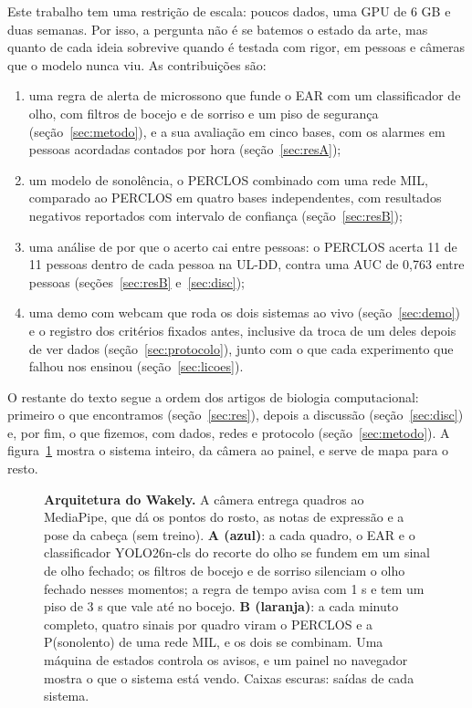 \documentclass[11pt,a4paper]{article}
\newcommand{\fig}[1]{\resizebox{\textwidth}{!}{}}
\begin{document}
Este trabalho tem uma restrição de escala: poucos dados, uma GPU de 6 GB e duas semanas. Por isso, a pergunta não é se batemos o estado da arte, mas quanto de cada ideia sobrevive quando é testada com rigor, em pessoas e câmeras que o modelo nunca viu. As contribuições são:
\begin{enumerate}
  \item uma regra de alerta de microssono que funde o EAR com um classificador de olho, com filtros de bocejo e de sorriso e um piso de segurança (seção~\ref{sec:metodo}), e a sua avaliação em cinco bases, com os alarmes em pessoas acordadas contados por hora (seção~\ref{sec:resA});
  \item um modelo de sonolência, o PERCLOS combinado com uma rede MIL, comparado ao PERCLOS em quatro bases independentes, com resultados negativos reportados com intervalo de confiança (seção~\ref{sec:resB});
  \item uma análise de por que o acerto cai entre pessoas: o PERCLOS acerta 11 de 11 pessoas dentro de cada pessoa na UL-DD, contra uma AUC de 0,763 entre pessoas (seções~\ref{sec:resB} e~\ref{sec:disc});
  \item uma demo com webcam que roda os dois sistemas ao vivo (seção~\ref{sec:demo}) e o registro dos critérios fixados antes, inclusive da troca de um deles depois de ver dados (seção~\ref{sec:protocolo}), junto com o que cada experimento que falhou nos ensinou (seção~\ref{sec:licoes}).
\end{enumerate}

O restante do texto segue a ordem dos artigos de biologia computacional: primeiro o que encontramos (seção~\ref{sec:res}), depois a discussão (seção~\ref{sec:disc}) e, por fim, o que fizemos, com dados, redes e protocolo (seção~\ref{sec:metodo}). A figura~\ref{fig:arq} mostra o sistema inteiro, da câmera ao painel, e serve de mapa para o resto.

\begin{figure}[!t]
\centering
\fig{fig_arquitetura.tex}
\caption{\textbf{Arquitetura do Wakely.} A câmera entrega quadros ao MediaPipe, que dá os pontos do rosto, as notas de expressão e a pose da cabeça (sem treino). \textbf{A (azul)}: a cada quadro, o EAR e o classificador YOLO26n-cls do recorte do olho se fundem em um sinal de olho fechado; os filtros de bocejo e de sorriso silenciam o olho fechado nesses momentos; a regra de tempo avisa com 1 s e tem um piso de 3 s que vale até no bocejo. \textbf{B (laranja)}: a cada minuto completo, quatro sinais por quadro viram o PERCLOS e a P(sonolento) de uma rede MIL, e os dois se combinam. Uma máquina de estados controla os avisos, e um painel no navegador mostra o que o sistema está vendo. Caixas escuras: saídas de cada sistema.}
\label{fig:arq}
\end{figure}
\end{document}
